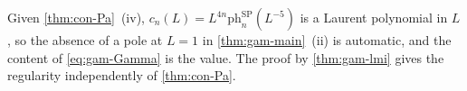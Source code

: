 \begin{rmk}[Regularity at \texorpdfstring{$L=1$}{L = 1} is automatic]
\label{rmk:gam-K8}
Given \cref{thm:con-Pa}~(iv), $c_n(L)=L^{4n}\mathrm{ph}^{\mathrm{SP}}_n(L^{-5})$ is a Laurent polynomial in $L$, so the absence of a pole at $L=1$ in \cref{thm:gam-main}~(ii) is automatic, and the content of \eqref{eq:gam-Gamma} is the value. The proof by \cref{thm:gam-lmi} gives the regularity independently of \cref{thm:con-Pa}.
\end{rmk}


